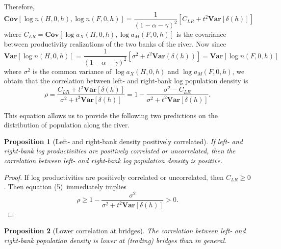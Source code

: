 \documentclass[12pt]{article}
\newtheorem{proposition}{Proposition}
\newcommand{\Var}{\mathbf{Var}}
\newcommand{\Cov}{\mathbf{Cov}}
\begin{document}
Therefore,%
\begin{equation*}
\Cov\left[ \log n\left( H,0,h\right) ,\log n\left( F,0,h\right) \right] =%
\frac{1}{\left( 1-\alpha-\gamma \right) ^{2}}\left[ C_{LR}+t^{2}\Var\left[ \delta
\left( h\right) \right] \right]
\end{equation*}%
where $C_{LR}=\Cov\left[ \log a_{X}\left( H,0,h\right) ,\log a_{M}\left(
F,0,h\right) \right] $ is the covariance between productivity realizations
of the two banks of the river. Now since%
\begin{equation*}
\Var\left[ \log n\left( H,0,h\right) \right] =\frac{1}{\left( 1-\alpha-\gamma
\right) ^{2}}\left[ \sigma ^{2}+t^{2}\Var\left( \delta \left( h\right)
\right) \right] =\Var\left[ \log n\left( F,0,h\right) \right]
\end{equation*}%
where $\sigma ^{2}$ is the common variance of $\log a_{X}\left( H,0,h\right) 
$ and $\log a_{M}\left( F,0,h\right) $, we obtain that the correlation
between left- and right-bank log population density is%
\begin{equation}
\rho =\frac{C_{LR}+t^{2}\Var\left[ \delta \left( h\right) \right] }{\sigma
^{2}+t^{2}\Var\left[ \delta \left( h\right) \right] }=1-\frac{\sigma
^{2}-C_{LR}}{\sigma ^{2}+t^{2}\Var\left[ \delta \left( h\right) \right] }.
\end{equation}

This equation allows us to provide the following two predictions on the
distribution of population along the river.

\begin{proposition}[Left- and right-bank density positively correlated]
If left- and right-bank log productivities are positively correlated or
uncorrelated, then the correlation between left- and right-bank log
population density is positive.
\end{proposition}

\begin{proof}
If log productivities are positively correlated or uncorrelated, then $%
C_{LR}\geq 0$. Then equation (5)\ immediately implies%
\[
\rho \geq 1-\frac{\sigma ^{2}}{\sigma ^{2}+t^{2}\Var\left[ \delta \left(
h\right) \right] }>0\text{.}
\]
\end{proof}

\begin{proposition}[Lower correlation at bridges]
The correlation between left- and right-bank population density is lower at
(trading) bridges than in general.
\end{proposition}
\end{document}
